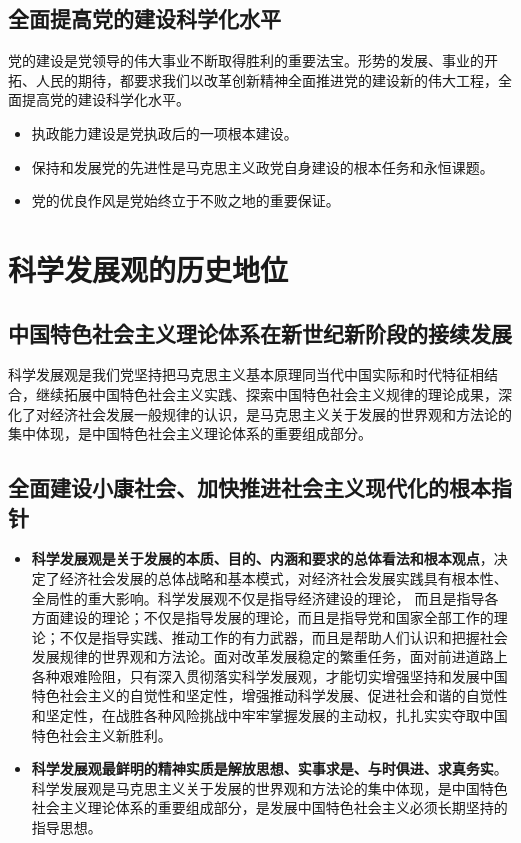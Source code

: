 \documentclass[12pt,openany]{ctexbook}
\begin{document}
\subsection{全面提高党的建设科学化水平}
党的建设是党领导的伟大事业不断取得胜利的重要法宝。形势的发展、事业的开拓、人民的期待，都要求我们以改革创新精神全面推进党的建设新的伟大工程，全面提高党的建设科学化水平。
\begin{itemize}
  \item 执政能力建设是党执政后的一项根本建设。
  \item 保持和发展党的先进性是马克思主义政党自身建设的根本任务和永恒课题。
  \item 党的优良作风是党始终立于不败之地的重要保证。
\end{itemize}
\section{科学发展观的历史地位}
\subsection{中国特色社会主义理论体系在新世纪新阶段的接续发展}
科学发展观是我们党坚持把马克思主义基本原理同当代中国实际和时代特征相结合，继续拓展中国特色社会主义实践、探索中国特色社会主义规律的理论成果，深化了对经济社会发展一般规律的认识，是马克思主义关于发展的世界观和方法论的集中体现，是中国特色社会主义理论体系的重要组成部分。
\subsection{全面建设小康社会、加快推进社会主义现代化的根本指针}
\begin{itemize}
  \item \textbf{科学发展观是关于发展的本质、目的、内涵和要求的总体看法和根本观点}，决定了经济社会发展的总体战略和基本模式，对经济社会发展实践具有根本性、全局性的重大影响。科学发展观不仅是指导经济建设的理论， 而且是指导各方面建设的理论；不仅是指导发展的理论，而且是指导党和国家全部工作的理论；不仅是指导实践、推动工作的有力武器，而且是帮助人们认识和把握社会发展规律的世界观和方法论。面对改革发展稳定的繁重任务，面对前进道路上各种艰难险阻，只有深入贯彻落实科学发展观，才能切实增强坚持和发展中国特色社会主义的自觉性和坚定性，增强推动科学发展、促进社会和谐的自觉性和坚定性，在战胜各种风险挑战中牢牢掌握发展的主动权，扎扎实实夺取中国特色社会主义新胜利。
  \item \textbf{科学发展观最鲜明的精神实质是解放思想、实事求是、与时俱进、求真务实}。科学发展观是马克思主义关于发展的世界观和方法论的集中体现，是中国特色社会主义理论体系的重要组成部分，是发展中国特色社会主义必须长期坚持的指导思想。
\end{itemize}
\end{document}
